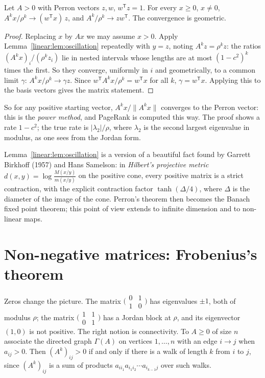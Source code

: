 \begin{theorem}\label{linear:thm:powerconv}
Let $A>0$ with Perron vectors $z,w$, $w^{\mathsf T}z=1$. For every $x\ge0$, $x\ne0$, $A^kx/\rho^k\to(w^{\mathsf T}x)\,z$, and
$A^k/\rho^k\to zw^{\mathsf T}$. The convergence is geometric.
\end{theorem}
\begin{proof}
Replacing $x$ by $Ax$ we may assume $x>0$. Apply Lemma~\ref{linear:lem:oscillation} repeatedly with $y=z$, noting $A^kz=\rho^kz$:
the ratios $(A^kx)_i/(\rho^kz_i)$ lie in nested intervals whose lengths are at most $(1-c^2)^k$ times the first. So they
converge, uniformly in $i$ and geometrically, to a common limit $\gamma$: $A^kx/\rho^k\to\gamma z$. Since $w^{\mathsf T}A^kx/
\rho^k=w^{\mathsf T}x$ for all $k$, $\gamma=w^{\mathsf T}x$. Applying this to the basis vectors gives the matrix statement.
\end{proof}

So for any positive starting vector, $A^kx/\|A^kx\|$ converges to the Perron vector: this is the \emph{power method}, and
PageRank is computed this way. The proof shows a rate $1-c^2$; the true rate is $|\lambda_2|/\rho$, where $\lambda_2$ is the
second largest eigenvalue in modulus, as one sees from the Jordan form.

\begin{remark}
Lemma~\ref{linear:lem:oscillation} is a version of a beautiful fact found by Garrett Birkhoff (1957) and Hans Samelson: in
\emph{Hilbert's projective metric} $d(x,y)=\log\frac{M(x/y)}{m(x/y)}$ on the positive cone, every positive matrix is a strict
contraction, with the explicit contraction factor $\tanh(\Delta/4)$, where $\Delta$ is the diameter of the image of the cone.
Perron's theorem then becomes the Banach fixed point theorem; this point of view extends to infinite dimension and to
non-linear maps.
\end{remark}

\section{Non-negative matrices: Frobenius's theorem}

Zeros change the picture. The matrix $\bigl(\begin{smallmatrix}0&1\\1&0\end{smallmatrix}\bigr)$ has eigenvalues $\pm1$, both
of modulus $\rho$; the matrix $\bigl(\begin{smallmatrix}1&1\\0&1\end{smallmatrix}\bigr)$ has a Jordan block at $\rho$, and its
eigenvector $(1,0)$ is not positive. The right notion is connectivity. To $A\ge0$ of size $n$ associate the directed graph
$\Gamma(A)$ on vertices $1,\dots,n$ with an edge $i\to j$ when $a_{ij}>0$. Then $(A^k)_{ij}>0$ if and only if there is a walk of
length $k$ from $i$ to $j$, since $(A^k)_{ij}$ is a sum of products $a_{ii_1}a_{i_1i_2}\cdots a_{i_{k-1}j}$ over such walks.

